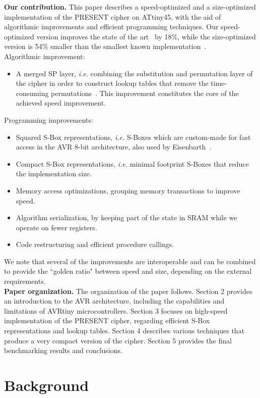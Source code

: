 \documentclass[11pt]{article}
\begin{document}
\textbf{Our contribution.} This paper describes a speed-optimized and a size-optimized implementation of the PRESENT cipher on ATtiny45, with the aid of algorithmic improvements and efficient programming techniques. Our speed-optimized version improves the state of the art~\cite{eisenbarth2012compact} by 18\%, while the size-optimized version is 54\% smaller than the smallest known implementation~\cite{eisenbarth2012compact}.\\
Algorithmic improvement:
\begin{itemize}[nolistsep]
  \item A merged SP layer, \emph{i.e.} combining the substitution and permutation layer of the cipher in order to construct lookup tables that remove the time-consuming permutations~\cite{gong_code}. This improvement constitutes the core of the achieved speed improvement.
\end{itemize}
Programming improvements:
\begin{itemize}[nolistsep]
  \item Squared S-Box representations, \emph{i.e.} S-Boxes which are custom-made for fast access in the AVR 8-bit architecture, also used by Eisenbarth~\cite{eisenbarth2012compact}.
  \item Compact S-Box representations, \emph{i.e.} minimal footprint S-Boxes that reduce the implementation size.
  \item Memory access optimizations, grouping memory transactions to improve speed.
  \item Algorithm serialization, by keeping part of the state in SRAM while we operate on fewer registers.
  \item Code restructuring and efficient procedure callings.
\end{itemize}
We note that several of the improvements are interoperable and can be combined to provide the ``golden ratio" between speed and size, depending on the external requirements.\\
\textbf{Paper organization.} The organization of the paper follows. Section 2 provides an introduction to the AVR architecture, including the capabilities and limitations of AVRtiny microcontrollers. Section 3 focuses on high-speed implementation of the PRESENT cipher, regarding efficient S-Box representations and lookup tables. Section 4 describes various techniques that produce a very compact version of the cipher. Section 5 provides the final benchmarking results and conclusions.

\section{Background}
\end{document}
